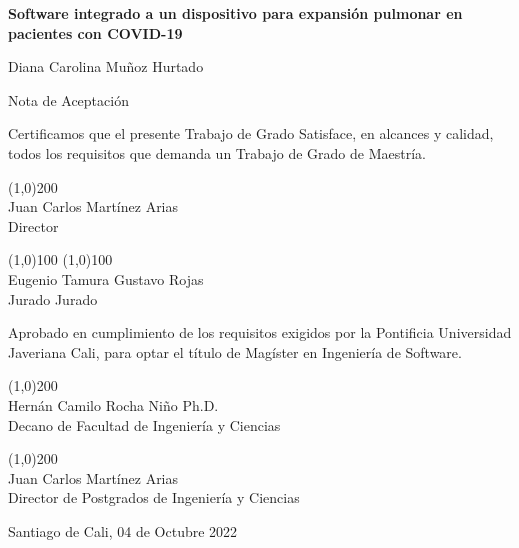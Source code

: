 \begin{center}
\textbf{Software integrado a un dispositivo para expansión pulmonar en pacientes con COVID-19}
\end{center}
\vspace{0.5cm}
\begin{center}
    Diana Carolina Muñoz Hurtado
\end{center}

\vspace{0.5cm}

Nota de Aceptación

Certificamos que el presente Trabajo de Grado Satisface, en alcances y calidad, todos los requisitos que demanda un Trabajo de Grado de Maestría.

\vspace{1cm}

\begin{center}
    \line(1,0){200} \\
    Juan Carlos Martínez Arias\\
    Director 
\end{center}

\vspace{1cm}


\line(1,0){100}  \qquad \qquad \qquad \qquad \qquad \qquad \qquad \qquad \qquad \qquad \line(1,0){100} \\ Eugenio Tamura 
\qquad \qquad \qquad \qquad \qquad \qquad \qquad \qquad \qquad \qquad \qquad   Gustavo Rojas \\  Jurado \qquad \qquad \qquad \qquad \qquad \qquad \qquad \qquad \qquad \qquad \qquad  \qquad \qquad \qquad Jurado 
\vspace{1cm}

Aprobado en cumplimiento de los requisitos exigidos por la Pontificia Universidad Javeriana Cali, para optar el título de Magíster en Ingeniería de Software.

\vspace{1cm}


\begin{center}
    \line(1,0){200} \\
    Hernán Camilo Rocha Niño Ph.D.\\
    Decano de Facultad de Ingeniería y Ciencias 
\end{center}

\vspace{1cm}

\begin{center}
    \line(1,0){200} \\
    Juan Carlos Martínez Arias\\
    Director de Postgrados de Ingeniería y Ciencias 
\end{center}

\vspace{0.5cm}

Santiago de Cali, 04 de Octubre 2022


\newpage


